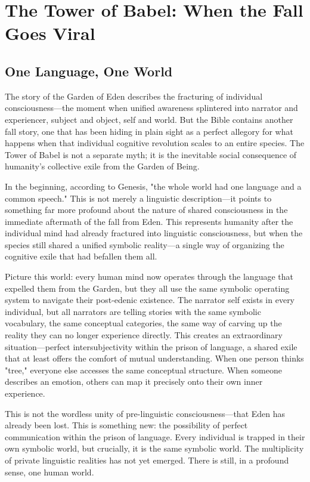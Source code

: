 \chapter{The Tower of Babel: When the Fall Goes Viral}

\section{One Language, One World}

The story of the Garden of Eden describes the fracturing of individual consciousness—the moment when unified awareness splintered into narrator and experiencer, subject and object, self and world. But the Bible contains another fall story, one that has been hiding in plain sight as a perfect allegory for what happens when that individual cognitive revolution scales to an entire species. The Tower of Babel is not a separate myth; it is the inevitable social consequence of humanity's collective exile from the Garden of Being.

In the beginning, according to Genesis, "the whole world had one language and a common speech." This is not merely a linguistic description—it points to something far more profound about the nature of shared consciousness in the immediate aftermath of the fall from Eden. This represents humanity after the individual mind had already fractured into linguistic consciousness, but when the species still shared a unified symbolic reality—a single way of organizing the cognitive exile that had befallen them all.

Picture this world: every human mind now operates through the language that expelled them from the Garden, but they all use the same symbolic operating system to navigate their post-edenic existence. The narrator self exists in every individual, but all narrators are telling stories with the same symbolic vocabulary, the same conceptual categories, the same way of carving up the reality they can no longer experience directly. This creates an extraordinary situation—perfect intersubjectivity within the prison of language, a shared exile that at least offers the comfort of mutual understanding. When one person thinks "tree," everyone else accesses the same conceptual structure. When someone describes an emotion, others can map it precisely onto their own inner experience.

This is not the wordless unity of pre-linguistic consciousness—that Eden has already been lost. This is something new: the possibility of perfect communication within the prison of language. Every individual is trapped in their own symbolic world, but crucially, it is the same symbolic world. The multiplicity of private linguistic realities has not yet emerged. There is still, in a profound sense, one human world.

